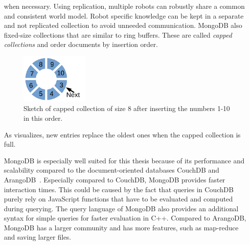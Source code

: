 when necessary. Using replication, multiple robots can robustly share
a common and consistent world model. Robot specific knowledge can be
kept in a separate and not replicated collection to avoid unneeded
communication. MongoDB also fixed-size collections that are similar to
ring buffers. These are called \emph{capped collections} and order
documents by insertion order.
\begin{figure}
  \centering
  \includegraphics[width=0.3\textwidth]{draw/capped-collection}%
  \caption{Sketch of capped collection of size 8 after inserting the numbers 1-10 in
  this order.}
  \vspace{-3mm}
  \label{fig:capped-collection}
\end{figure}
As 
visualizes, new entries replace the oldest ones when the capped
collection is full.

MongoDB is especially well suited for this thesis because of its
performance and scalability compared to the document-oriented
databases CouchDB and
ArangoDB~\cite{db-comparison,arango-vs-mongo}. Especially compared to
CouchDB, MongoDB provides faster interaction times. This could be
caused by the fact that queries in CouchDB purely rely on JavaScript
functions that have to be evaluated and computed during
querying. The query language of MongoDB also provides an additional
syntax for simple queries for faster evaluation in C++. Compared to
ArangoDB, MongoDB has a larger community and has more features, such
as map-reduce and saving larger files. 

